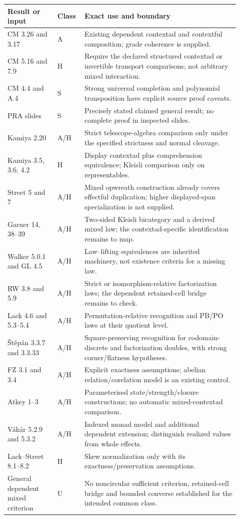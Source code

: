 \documentclass[11pt,a4paper]{article}
\begin{document}
\small
\begin{longtable}{@{}p{0.20\linewidth}p{0.10\linewidth}p{0.62\linewidth}@{}}
\toprule
Result or input & Class & Exact use and boundary \\
\midrule
\endhead
CM 3.26 and 3.17 & A & Existing dependent contextad and contextful composition; grade coherence is supplied. \\
CM 5.16 and 7.9 & H & Require the declared structured contextad or invertible transport comparisons; not arbitrary mixed interaction. \\
CM 4.4 and A.4 & S & Strong universal completion and polynomial transposition have explicit source proof caveats. \\
PRA slides & S & Precisely stated claimed general result; no complete proof in inspected slides. \\
Kamiya 2.20 & A/H & Strict telescope-algebra comparison only under the specified strictness and normal cleavage. \\
Kamiya 3.5, 3.6, 4.2 & H & Display contextad plus comprehension equivalence; Kleisli comparison only on representables. \\
Street 5 and 7 & A/H & Mixed opwreath construction already covers effectful duplication; higher displayed-span specialization is not supplied. \\
Garner 14, 38--39 & A/H & Two-sided Kleisli bicategory and a derived mixed law; the contextad-specific identification remains to map. \\
Walker 5.0.1 and GL 4.5 & A/H & Law--lifting equivalences are inherited machinery, not existence criteria for a missing law. \\
RW 3.8 and 5.9 & A/H & Strict or isomorphism-relative factorization laws; the dependent retained-cell bridge remains to check. \\
Lack 4.6 and 5.3--5.4 & A/H & Permutation-relative recognition and PB/PO laws at their quotient level. \\
\v{S}t\v{e}p\'an 3.3.7 and 3.3.33 & A/H & Square-preserving recognition for codomain-discrete and factorization doubles, with strong corner/flatness hypotheses. \\
FZ 3.1 and 3.4 & A/H & Explicit exactness assumptions; abelian relation/corelation model is an existing control. \\
Atkey 1--3 & A/H & Parameterised state/strength/closure constructions; no automatic mixed-contextad comparison. \\
V\'ak\'ar 5.2.9 and 5.3.2 & A/H & Indexed monad model and additional dependent extension; distinguish realized values from whole effects. \\
Lack--Street 8.1--8.2 & H & Skew normalization only with its exactness/preservation assumptions. \\
General dependent mixed criterion & U & No noncircular sufficient criterion, retained-cell bridge and bounded converse established for the intended common class. \\
\bottomrule
\end{longtable}
\normalsize
\end{document}
